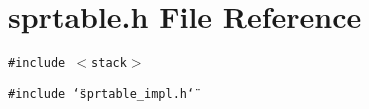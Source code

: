 \section{sprtable.h File Reference}
\label{sprtable_8h}
{\tt \#include $<$stack$>$}\par
{\tt \#include \char`\"{}sprtable\_\-impl.h\char`\"{}}\par
